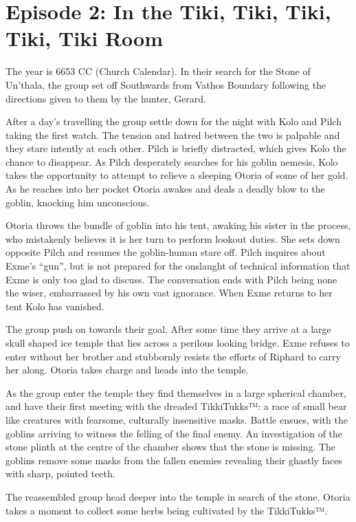 \documentclass[letterpaper,10pt,twoside,twocolumn,openany]{book}
\begin{document}
\clearpage

\section{Episode 2: In the Tiki, Tiki, Tiki, Tiki, Tiki Room}

The year is 6653 CC (Church Calendar). In their search for the Stone of Un'thala, the group set off Southwards from Vathos Boundary following the directions given to them by the hunter, Gerard.

After a day’s travelling the group settle down for the night with Kolo and Pilch taking the first watch. The tension and hatred between the two is palpable and they stare intently at each other. Pilch is briefly distracted, which gives Kolo the chance to disappear. As Pilch desperately searches for his goblin nemesis, Kolo takes the opportunity to attempt to relieve a sleeping Otoria of some of her gold. As he reaches into her pocket Otoria awakes and deals a deadly blow to the goblin, knocking him unconscious.

Otoria throws the bundle of goblin into his tent, awaking his sister in the process, who mistakenly believes it is her turn to perform lookout duties. She sets down opposite Pilch and resumes the goblin-human stare off. Pilch inquires about Exme’s “gun”, but is not prepared for the onslaught of technical information that Exme is only too glad to discuss. The conversation ends with Pilch being none the wiser, embarrassed by his own vast ignorance. When Exme returns to her tent Kolo has vanished.

The group push on towards their goal. After some time they arrive at a large skull shaped ice temple that lies across a perilous looking bridge. Exme refuses to enter without her brother and stubbornly resists the efforts of Riphard to carry her along. Otoria takes charge and heads into the temple.

As the group enter the temple they find themselves in a large spherical chamber, and have their first meeting with the dreaded TikkiTukks™: a race of small bear like creatures with fearsome, culturally insensitive masks. Battle ensues, with the goblins arriving to witness the felling of the final enemy. An investigation of the stone plinth at the centre of the chamber shows that the stone is missing. The goblins remove some masks from the fallen enemies revealing their ghastly faces with sharp, pointed teeth.

The reassembled group head deeper into the temple in search of the stone. Otoria takes a moment to collect some herbs being cultivated by the TikkiTukks™.
\end{document}
